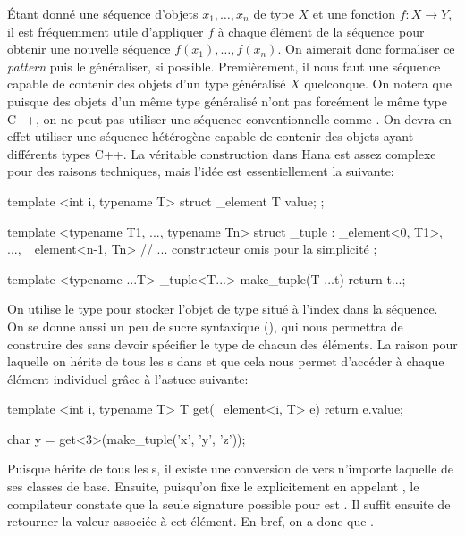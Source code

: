 Étant donné une séquence d'objets $x_1, \hdots, x_n$ de type $X$ et une
fonction $f : X \to Y$, il est fréquemment utile d'appliquer $f$ à chaque
élément de la séquence pour obtenir une nouvelle séquence $f(x_1), \hdots, f(x_n)$.
On aimerait donc formaliser ce \textit{pattern} puis le généraliser, si possible.
Premièrement, il nous faut une séquence capable de contenir des objets d'un
type généralisé $X$ quelconque. On notera que puisque des objets d'un même type
généralisé n'ont pas forcément le même type C++, on ne peut pas utiliser une
séquence conventionnelle comme . On devra en effet utiliser
une séquence hétérogène capable de contenir des objets ayant différents types
C++. La véritable construction dans Hana est assez complexe pour des raisons
techniques, mais l'idée est essentiellement la suivante:
\begin{cpp}
    template <int i, typename T>
    struct _element { T value; };

    template <typename T1, ..., typename Tn>
    struct _tuple : _element<0, T1>, ..., _element<n-1, Tn> {
        // ... constructeur omis pour la simplicité
    };

    template <typename ...T>
    _tuple<T...> make_tuple(T ...t) {
        return {t...};
    }
\end{cpp}

On utilise le type  pour stocker l'objet de type 
situé à l'index  dans la séquence. On se donne aussi un peu de sucre
syntaxique (), qui nous permettra de construire des
 sans devoir spécifier le type de chacun des éléments.
La raison pour laquelle on hérite de tous les s dans
 et que cela nous permet d'accéder à chaque élément individuel
grâce à l'astuce suivante:
\begin{cpp}
    template <int i, typename T>
    T get(_element<i, T> e) {
        return e.value;
    }

    char y = get<3>(make_tuple('x', 'y', 'z'));
\end{cpp}

Puisque  hérite de tous les s, il existe une
conversion de  vers n'importe laquelle de ses classes de base.
Ensuite, puisqu'on fixe le  explicitement en appelant ,
le compilateur constate que la seule signature possible pour  est
. Il suffit ensuite de retourner la valeur
associée à cet élément. En bref, on a donc que
.


